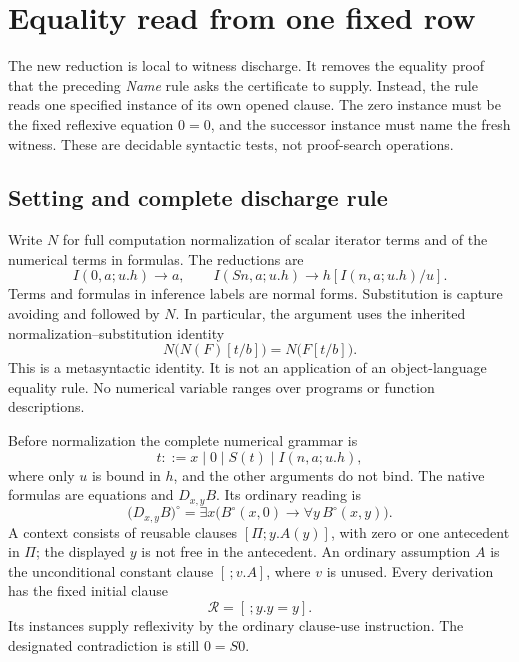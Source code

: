 \section{Equality read from one fixed row}
\label{sec:first-row-mathematics}

The new reduction is local to witness discharge.  It removes the equality
proof that the preceding \emph{Name} rule asks the certificate to supply.
Instead, the rule reads one specified instance of its own opened clause.
The zero instance must be the fixed reflexive equation $0=0$, and the
successor instance must name the fresh witness.  These are decidable
syntactic tests, not proof-search operations.

\subsection{Setting and complete discharge rule}

Write $N$ for full computation normalization of scalar iterator terms and
of the numerical terms in formulas.  The reductions are
\[
 I(0,a;u.h)\longrightarrow a,
 \qquad
 I(Sn,a;u.h)\longrightarrow h[I(n,a;u.h)/u].
\]
Terms and formulas in inference labels are normal forms.  Substitution is
capture avoiding and followed by $N$.  In particular, the argument uses
the inherited normalization--substitution identity
\begin{equation}
 N\bigl(N(F)[t/b]\bigr)=N\bigl(F[t/b]\bigr).
 \label{eq:row-normalization-coherence}
\end{equation}
This is a metasyntactic identity.  It is not an application of an
object-language equality rule.  No numerical variable ranges over
programs or function descriptions.

Before normalization the complete numerical grammar is
\[t::=x\mid 0\mid S(t)\mid I(n,a;u.h),\]
where only $u$ is bound in $h$, and the other arguments do not bind.
The native formulas are equations and $D_{x,y}B$.  Its ordinary reading is
\[
 \bigl(D_{x,y}B\bigr)^\circ
   =\exists x\bigl(B^\circ(x,0)\to\forall y\,B^\circ(x,y)\bigr).
\]
A context consists of reusable clauses $[\Pi;y.A(y)]$, with zero or one
antecedent in $\Pi$; the displayed $y$ is not free in the antecedent.
An ordinary assumption $A$ is the unconditional constant clause
$[\,;v.A]$, where $v$ is unused.  Every derivation has the fixed initial
clause
\[
                    \mathcal R=[\,;y.y=y].
\]
Its instances supply reflexivity by the ordinary clause-use instruction.
The designated contradiction is still $0=S0$.

